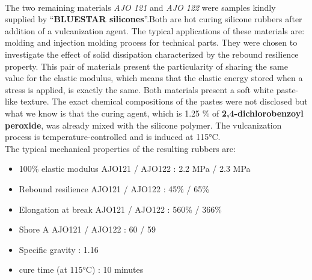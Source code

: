 \paragraph{}
The two remaining materials \emph{AJO 121} and \emph{AJO 122} were samples kindly supplied by "`\textbf{BLUESTAR silicones\textcopyright}"'.Both are hot curing silicone rubbers after addition of a vulcanization agent. The typical applications of these materials are: molding and injection molding process for technical parts. They were chosen to investigate the effect of solid dissipation characterized by the rebound resilience property. This pair of materials present the particularity of sharing the same value for the elastic modulus, which means that the elastic energy stored when a stress is applied, is exactly the same. Both materials present a soft white paste-like texture. The exact chemical compositions of the pastes were not disclosed but what we know is that the curing agent, which is 1.25 \% of \textbf{2,4-dichlorobenzoyl peroxide}, was already mixed with the silicone polymer. The vulcanization process is temperature-controlled and is induced at 115°C.\\

The typical mechanical properties of the resulting rubbers are:
\begin{itemize}
	\item 100\% elastic modulus AJO121 / AJO122 : 2.2 MPa / 2.3 MPa
	\item Rebound resilience AJO121 / AJO122 : 45\% / 65\%
	\item Elongation at break AJO121 / AJO122 : 560\% / 366\%
	\item Shore A AJO121 / AJO122 : 60 / 59 
	\item Specific gravity : 1.16
	\item cure time (at 115°C) : 10 minutes
\end{itemize}

